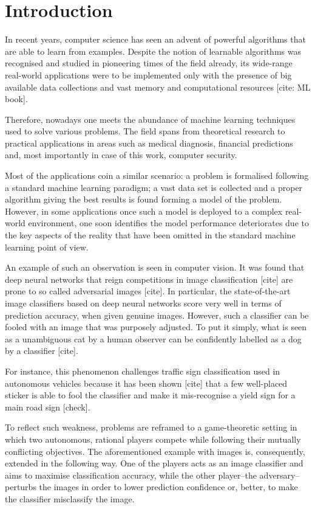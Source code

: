 \documentclass[10pt]{article}
\date{\vspace{-5ex}}
\begin{document}
\section{Introduction}

In recent years, computer science has seen an advent of powerful
algorithms that are able to learn from examples. Despite the notion of
learnable algorithms was recognised and studied in pioneering times of
the field already, its wide-range real-world applications were to be
implemented only with the presence of big available data collections and
vast memory and computational resources {[}cite: ML book{]}.

Therefore, nowadays one meets the abundance of machine learning
techniques used to solve various problems. The field spans from
theoretical research to practical applications in areas such as medical
diagnosis, financial predictions and, most importantly in case of this
work, computer security.

Most of the applications coin a similar scenario: a problem is
formalised following a standard machine learning paradigm; a vast data
set is collected and a proper algorithm giving the best results is found
forming a model of the problem. However, in some applications once such
a model is deployed to a complex real-world environment, one soon
identifies the model performance deteriorates due to the key aspects of
the reality that have been omitted in the standard machine learning
point of view.

An example of such an observation is seen in computer vision. It was
found that deep neural networks that reign competitions in image
classification {[}cite{]} are prone to so called adversarial images
{[}cite{]}. In particular, the state-of-the-art image classifiers based
on deep neural networks score very well in terms of prediction accuracy,
when given genuine images. However, such a classifier can be fooled with
an image that was purposely adjusted. To put it simply, what is seen as
a unambiguous cat by a human observer can be confidently labelled as a
dog by a classifier {[}cite{]}.

For instance, this phenomenon challenges traffic sign classification
used in autonomous vehicles because it has been shown {[}cite{]} that a
few well-placed sticker is able to fool the classifier and make it
mis-recognise a yield sign for a main road sign {[}check{]}.

To reflect such weakness, problems are reframed to a game-theoretic
setting in which two autonomous, rational players compete while
following their mutually conflicting objectives. The aforementioned
example with images is, consequently, extended in the following way. One
of the players acts as an image classifier and aims to maximise
classification accuracy, while the other player–the adversary–perturbs
the images in order to lower prediction confidence or, better, to make
the classifier misclassify the image.
\end{document}
